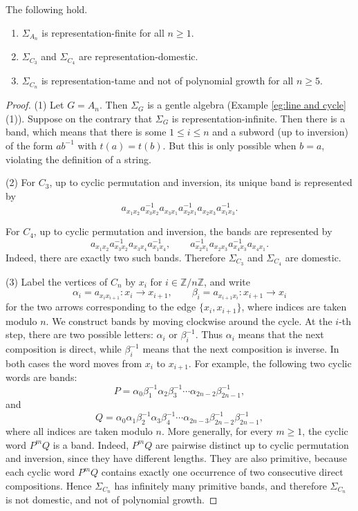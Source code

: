 \documentclass[a4paper,leqno]{amsart}
\begin{document}
\begin{prop}\label{prop:biserial rep type}
The following hold.
\begin{enumerate}
    \item $\Sigma_{A_n}$ is representation-finite for all $n\ge 1$.
    \item $\Sigma_{C_3}$ and $\Sigma_{C_4}$ are representation-domestic.
    \item $\Sigma_{C_n}$ is representation-tame and not of polynomial growth for all $n\geq 5$.
\end{enumerate}
\end{prop}
\begin{proof}
(1) Let $G=A_n$. Then $\Sigma_G$ is a gentle algebra (Example \ref{eg:line and cycle} (1)).  Suppose on the contrary that $\Sigma_G$ is representation-infinite.  Then there is a band, which means that there is some $1\le i\le n$ and a subword (up to inversion) of the form $ab^{-1}$ with $t(a)=t(b)$.  But this is only possible when $b=a$, violating the definition of a string.

(2)  %
For $C_3$, up to cyclic permutation and inversion, its unique band is represented by
$$a_{x_1x_2}a_{x_3x_2}^{-1}a_{x_3x_1}a_{x_2x_1}^{-1}a_{x_2x_3}a_{x_1x_3}^{-1}.$$

For $C_4$, up to cyclic permutation and inversion, the bands are represented by
$$a_{x_1x_2}a_{x_3x_2}^{-1}a_{x_3x_4}a_{x_1x_4}^{-1},\qquad a_{x_2x_1}^{-1}a_{x_2x_3}a_{x_4x_3}^{-1}a_{x_4x_1}.$$
Indeed, there are exactly two such bands. Therefore $\Sigma_{C_3}$ and $\Sigma_{C_4}$ are domestic.

(3)  Label the vertices of $C_n$ by $x_i$ for $i\in\mathbb Z/n\mathbb Z$, and write
$$\alpha_i=a_{x_ix_{i+1}}:x_i\to x_{i+1},\qquad\beta_i=a_{x_{i+1}x_i}:x_{i+1}\to x_i$$
for the two arrows corresponding to the edge $\{x_i,x_{i+1}\}$, where indices are taken modulo $n$.
We construct bands by moving clockwise around the cycle. At the $i$-th step, there are two possible letters: $\alpha_i$ or $\beta_i^{-1}$.
Thus $\alpha_i$ means that the next composition is direct, while $\beta_i^{-1}$ means that the next composition is inverse. In both cases the word moves from $x_i$ to $x_{i+1}$. For example, the following two cyclic words are bands:
$$P=\alpha_0\beta_1^{-1}\alpha_2\beta_3^{-1}\cdots \alpha_{2n-2}\beta_{2n-1}^{-1},$$
and
$$Q=\alpha_0\alpha_1\beta_2^{-1}\alpha_3\beta_4^{-1}\cdots
\alpha_{2n-3}\beta_{2n-2}^{-1}\beta_{2n-1}^{-1},$$
where all indices are taken modulo $n$. More generally, for every $m\geq 1$, the cyclic word $P^mQ$ is a band. Indeed, $P^mQ$ are pairwise distinct up to cyclic permutation and inversion, since they have different lengths. They are also primitive, because each cyclic word $P^mQ$ contains exactly one occurrence of two consecutive direct compositions. Hence $\Sigma_{C_n}$ has infinitely many primitive bands, and therefore $\Sigma_{C_n}$ is not domestic, and not of polynomial growth.
\end{proof}
\end{document}
